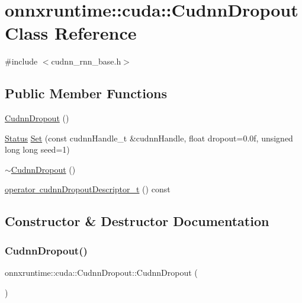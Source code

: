 \hypertarget{classonnxruntime_1_1cuda_1_1CudnnDropout}{}\section{onnxruntime\+:\+:cuda\+:\+:Cudnn\+Dropout Class Reference}
\label{classonnxruntime_1_1cuda_1_1CudnnDropout}


{\ttfamily \#include $<$cudnn\+\_\+rnn\+\_\+base.\+h$>$}

\subsection*{Public Member Functions}
\begin{DoxyCompactItemize}
\item 
\mbox{\hyperlink{classonnxruntime_1_1cuda_1_1CudnnDropout_a2ef9a66682883fb75ec2667e066c04c5}{Cudnn\+Dropout}} ()
\item 
\mbox{\hyperlink{classonnxruntime_1_1common_1_1Status}{Status}} \mbox{\hyperlink{classonnxruntime_1_1cuda_1_1CudnnDropout_a947258515c2a88c8738302bfd25ae314}{Set}} (const cudnn\+Handle\+\_\+t \&cudnn\+Handle, float dropout=0.\+0f, unsigned long long seed=1)
\item 
\mbox{\hyperlink{classonnxruntime_1_1cuda_1_1CudnnDropout_a1ac7bae3ed96e91481c511293d62ebe4}{$\sim$\+Cudnn\+Dropout}} ()
\item 
\mbox{\hyperlink{classonnxruntime_1_1cuda_1_1CudnnDropout_a24976cd26d90c7c4a3d95ca8e2f02e9b}{operator cudnn\+Dropout\+Descriptor\+\_\+t}} () const
\end{DoxyCompactItemize}


\subsection{Constructor \& Destructor Documentation}
\mbox{\label{classonnxruntime_1_1cuda_1_1CudnnDropout_a2ef9a66682883fb75ec2667e066c04c5}} 
\subsubsection{\texorpdfstring{Cudnn\+Dropout()}{CudnnDropout()}}
{\footnotesize\ttfamily onnxruntime\+::cuda\+::\+Cudnn\+Dropout\+::\+Cudnn\+Dropout (\begin{DoxyParamCaption}{ }\end{DoxyParamCaption})\hspace{0.3cm}{\ttfamily [inline]}}

